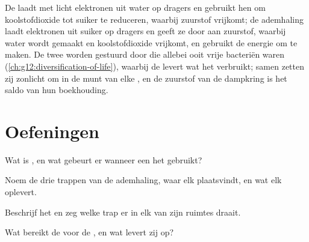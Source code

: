 \begin{remark}\label{rem:g12:respiration-fermentation:mirror}
De  laadt met licht elektronen uit water op dragers en
gebruikt hen om koolstofdioxide tot suiker te reduceren, waarbij zuurstof
vrijkomt; de ademhaling laadt elektronen uit suiker op dragers en geeft ze
door aan zuurstof, waarbij water wordt gemaakt en koolstofdioxide vrijkomt,
en gebruikt de energie om  te maken. De twee worden gestuurd door
 die allebei ooit vrije bacteriën waren
(\cref{ch:g12:diversification-of-life}), waarbij de  levert
wat het  verbruikt; samen zetten zij zonlicht om in de munt
van elke , en de zuurstof van de dampkring is het saldo van hun
boekhouding.
\end{remark}

\section{Oefeningen}

\begin{exercise}[$\star$]\label{exo:g12:respiration-fermentation:1}
Wat is , en wat gebeurt er wanneer een  het gebruikt?
\end{exercise}

\begin{exercise}[$\star$]\label{exo:g12:respiration-fermentation:2}
Noem de drie trappen van de ademhaling, waar elk plaatsvindt, en wat elk
oplevert.
\end{exercise}

\begin{exercise}[$\star$]\label{exo:g12:respiration-fermentation:3}
Beschrijf het  en zeg welke trap er in elk van zijn ruimtes
draait.
\end{exercise}

\begin{exercise}[$\star$]\label{exo:g12:respiration-fermentation:4}
Wat bereikt de  voor de , en wat levert zij op?
\end{exercise}

